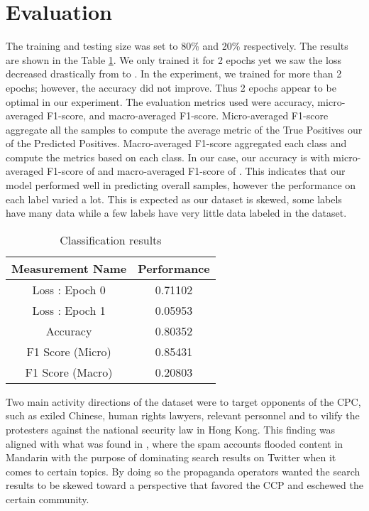 \documentclass[sigconf]{acmart}
\begin{document}
\section{Evaluation}
The training and testing size was set to 80\% and 20\% respectively. The results are shown in the Table \ref{tab:res}. We only trained it for 2 epochs yet we saw the loss decreased drastically from  to . In the experiment, we trained for more than 2 epochs; however, the accuracy did not improve. Thus 2 epochs appear to be optimal in our experiment. The evaluation metrics used were accuracy, micro-averaged F1-score, and macro-averaged F1-score. Micro-averaged F1-score aggregate all the samples to compute the average metric of the True Positives our of the Predicted Positives. Macro-averaged F1-score aggregated each class and compute the metrics based on each class. In our case, our accuracy is  with micro-averaged F1-score of  and macro-averaged F1-score of . This indicates that our model performed well in predicting overall samples, however the performance on each label varied a lot. This is expected as our dataset is skewed, some labels have many data while a few labels have very little data labeled in the dataset. 

\begin{table}[ht]
  \caption{Classification results}
  \label{tab:res}
  \begin{tabular}{cc}
    \toprule
    Measurement Name & Performance \\
    \midrule
    Loss : Epoch 0 & 0.71102 \\
    Loss : Epoch 1 & 0.05953 \\
    Accuracy& 0.80352 \\
    F1 Score (Micro) & 0.85431 \\
    F1 Score (Macro) & 0.20803 \\
  \bottomrule
\end{tabular}
\end{table}



Two main activity directions of the dataset were to target opponents of the CPC, such as exiled Chinese, human rights lawyers, relevant personnel and to vilify the protesters against the national security law in Hong Kong. This finding was aligned with what was found in \cite{uren2019tweeting} \cite{bolsover2017computational}, where the spam accounts flooded content in Mandarin with the purpose of dominating search results on Twitter when it comes to certain topics. By doing so the propaganda operators wanted the search results to be skewed toward a perspective that favored the CCP and eschewed the certain community.
\end{document}

